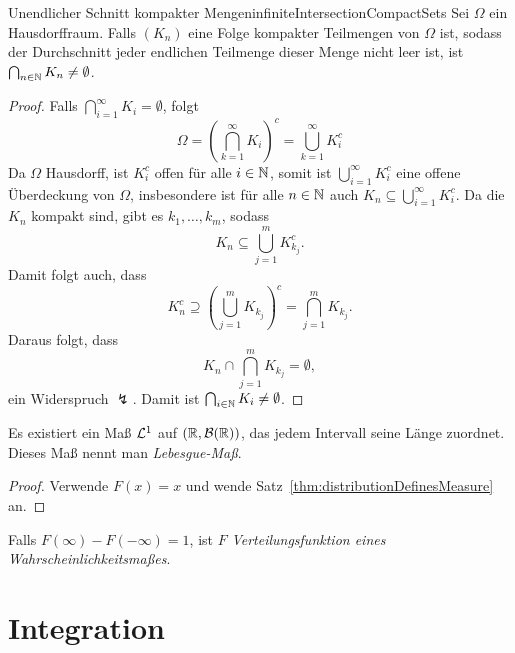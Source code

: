 \documentclass[language=ngerman]{../../Template/TemplateLecture}
\begin{document}
\begin{lem}{Unendlicher Schnitt kompakter Mengen}{infiniteIntersectionCompactSets}
    Sei $\Omega$ ein Hausdorffraum. Falls $(K_n)$ eine Folge kompakter Teilmengen von $\Omega$ ist, sodass der Durchschnitt jeder endlichen Teilmenge dieser Menge nicht leer ist, ist $\bigcap_{n \in \mathbb{N}} K_n \neq \emptyset$. 
\end{lem}
\begin{proof}
    Falls $\bigcap_{i = 1}^\infty K_i = \emptyset$, folgt 
    \begin{equation}
        \Omega = \left(\bigcap_{k = 1}^\infty K_i \right)^c = \bigcup_{k = 1}^\infty K_i^c
    \end{equation}
    Da $\Omega$ Hausdorff, ist $K_i^c$ offen für alle $i \in \mathbb{N}$, somit ist $\bigcup_{i=1}^\infty K_i^c$ eine offene Überdeckung von $\Omega$, insbesondere ist für alle $n \in \mathbb{N}$ auch $K_n \subseteq \bigcup_{i = 1}^\infty K_i^c$. Da die $K_n$ kompakt sind, gibt es $k_1, \ldots, k_m$, sodass 
    \begin{equation}
        K_n \subseteq \bigcup_{j = 1}^m K_{k_j}^c.
    \end{equation}
    Damit folgt auch, dass 
    \begin{equation}
        K_n^c \supseteq \left(\bigcup_{j=1}^m K_{k_j}\right)^c = \bigcap_{j=1}^m K_{k_j}.
    \end{equation}
    Daraus folgt, dass 
    \begin{equation}
        K_n \cap \bigcap_{j = 1}^m K_{k_j} = \emptyset,
    \end{equation}
    ein Widerspruch $\lightning$. Damit ist $\bigcap_{i \in \mathbb{N}} K_i \neq \emptyset$.
\end{proof}

\begin{corollary}
    Es existiert ein Maß $\mathcal{L}^1$ auf $(\mathbb{R}, \mathcal{B}(\mathbb{R}))$, das jedem Intervall seine Länge zuordnet. Dieses Maß nennt man \emph{Lebesgue-Maß}.
\end{corollary}
\begin{proof}
    Verwende $F(x) = x$ und wende Satz~\ref{thm:distributionDefinesMeasure} an.
\end{proof}
Falls $F(\infty) - F(-\infty) = 1$, ist $F$ \emph{Verteilungsfunktion eines Wahrscheinlichkeitsmaßes}.


\section{Integration}
\end{document}
